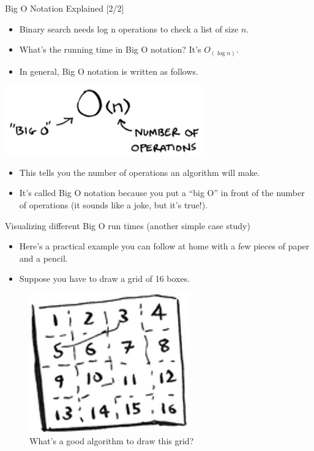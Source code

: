 \documentclass[ignorenonframetext,]{beamer}
\providecommand{\tightlist}{%
  \setlength{\itemsep}{0pt}\setlength{\parskip}{0pt}}
\begin{document}
\begin{frame}{Big O Notation Explained {[}2/2{]}}
\protect\hypertarget{big-o-notation-explained-22}{}

\begin{itemize}
\tightlist
\item
  Binary search needs log n operations to check a list of size \(n\).
\item
  What's the running time in Big O notation? It's \(O_{(\log n)}\).
\item
  In general, Big O notation is written as follows.
\end{itemize}

\includegraphics{./Chapter01-figure/big_o_notation.png}

\begin{itemize}
\tightlist
\item
  This tells you the number of operations an algorithm will make.
\item
  It's called Big O notation because you put a ``big O'' in front of the
  number of operations (it sounds like a joke, but it's true!).
\end{itemize}

\end{frame}

\begin{frame}{Visualizing different Big O run times (another simple case
study)}
\protect\hypertarget{visualizing-different-big-o-run-times-another-simple-case-study}{}

\begin{itemize}
\tightlist
\item
  Here's a practical example you can follow at home with a few pieces of
  paper and a pencil.
\item
  Suppose you have to draw a grid of 16 boxes.
\end{itemize}

\begin{figure}
\centering
\includegraphics{./Chapter01-figure/grid_drawing_01.png}
\caption{What's a good algorithm to draw this grid?}
\end{figure}

\end{frame}
\end{document}

